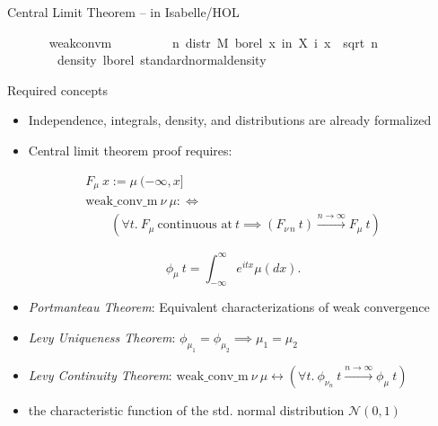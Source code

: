\documentclass[usepdftitle=false]{beamer}
\begin{document}
\begin{frame}{Central Limit Theorem -- in Isabelle/HOL}
\begin{isabellebody}
\ \ \isanewline
\ \ \ \ {\isachardoublequoteopen}weak{\isacharunderscore}conv{\isacharunderscore}m\ \isanewline
\ \ \ \ \ \ \ \ {\isacharparenleft}{\isasymlambda}n{\isachardot}\ distr\ M\ borel\ {\isacharparenleft}{\isasymlambda}x{\isachardot}\ {\isasymSum}i{\isacharless}n{\isachardot}\ X\ i\ x\ {\isacharslash}\ sqrt\ {\isacharparenleft}n\ {\isacharasterisk}\ {\isasymsigma}\isanewline
\ \ \ \ \ \ \ \ {\isacharparenleft}density\ lborel\ standard{\isacharunderscore}normal{\isacharunderscore}density{\isacharparenright}{\isachardoublequoteclose}
\end{isabellebody}

\end{frame} %

\begin{frame}{Required concepts} %

\begin{itemize}

\item Independence, integrals, density, and distributions are already formalized

\item Central limit theorem proof requires:
\end{itemize}
%
\begin{definition}%
\vspace{-1em}
\[ \begin{array}{l}
  F_\mu~x := \mu~(-\infty, x]\\
  \text{weak{\_}conv{\_}m}~\nu~\mu :\Leftrightarrow \\
  \qquad     (\forall t.~ F_\mu~\text{continuous at}~ t \implies
         (F_{\nu\,n}~t) \xrightarrow{n \to \infty} F_\mu~t)
\end{array} \]
\end{definition}

\begin{definition}%
\vspace{-1em}
\[ \phi_\mu~t = \int_{-\infty}^{\infty} e^{itx} \mu(dx). \]
\end{definition}

\begin{itemize}
  \item \emph{Portmanteau Theorem}: Equivalent characterizations of weak convergence
  \item \emph{Levy Uniqueness Theorem}: $\phi_{\mu_1} = \phi_{\mu_2} \implies \mu_1 = \mu_2$
  \item \emph{Levy Continuity Theorem}: $\text{weak{\_}conv{\_}m}~\nu~\mu \longleftrightarrow
     (\forall t.\ \phi_{\nu_n}~t \xrightarrow{n \to \infty} \phi_\mu~t)$
  \item the characteristic function of the std. normal distribution $\mathcal{N}(0, 1)$
\end{itemize}

\end{frame} %
\end{document}
